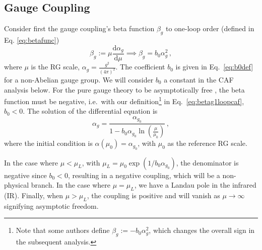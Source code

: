 \subsection{Gauge Coupling}\label{sec:CAFgauge}
Consider first the gauge coupling's beta function $\beta_g$ to one-loop order (defined in Eq. \eqref{eq:betafunc})
\begin{equation}
    \beta_g:=\mu\frac{\text{d}\alpha_g}{\text{d}\mu}\implies \beta _g= b_0\alpha_g^2\,,\label{eq:betag1loopcaf}
\end{equation}
where $\mu$ is the RG scale, $\alpha_g=\frac{g^2}{(4\pi)^2}$. The coefficient $b_0$ is given in Eq.~\eqref{eq:b0def} for a non-Abelian gauge group. We will consider $b_0$ a constant in the CAF analysis below. For the pure gauge theory to be asymptotically free \cite{Politzer:1974fr}, the beta function must be negative, i.e.\ with our definition\footnote{Note that some authors define $\beta_g:=-b_0\alpha_g^2$, which changes the overall sign in the subsequent analysis.} in Eq.~\eqref{eq:betag1loopcaf}, $b_0<0$. 
The solution of the differential equation is
\begin{equation}
    \alpha_g=\frac{\alpha_{g_0}}{1-b_0 \alpha_{g_0} \ln \left(\frac{\mu}{\mu_0 }\right)}\,,
    \label{eq:solbetag1loop}
\end{equation}
where the initial condition is $\alpha(\mu_0)=\alpha_{g_0}$, with $\mu_0$ as the reference RG scale. 

In the case where $\mu<\mu_L$, with $\mu_L=\mu_0\exp(1/{b_0\alpha_{g_0}})$, the denominator is negative since $b_0<0$, resulting in a negative coupling, which will be a non-physical branch. In the case where $\mu=\mu_L$, we have a Landau pole in the infrared (IR). Finally, when $\mu>\mu_L$, the coupling is positive and will vanish as $\mu\to\infty$ signifying asymptotic freedom.